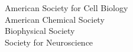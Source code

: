 \begin{center}
American Society for Cell Biology \\
American Chemical Society \\
Biophysical Society \\
Society for Neuroscience \\

\end{center}
